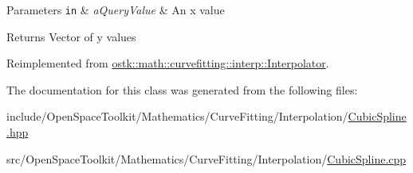 \begin{DoxyParams}[1]{Parameters}
\mbox{\tt in}  & {\em a\+Query\+Value} & An x value \\
\hline
\end{DoxyParams}
\begin{DoxyReturn}{Returns}
Vector of y values 
\end{DoxyReturn}


Reimplemented from \hyperlink{classostk_1_1math_1_1curvefitting_1_1interp_1_1_interpolator_af678ba11fe02754aeaa821bc101fcd87}{ostk\+::math\+::curvefitting\+::interp\+::\+Interpolator}.



The documentation for this class was generated from the following files\+:\begin{DoxyCompactItemize}
\item 
include/\+Open\+Space\+Toolkit/\+Mathematics/\+Curve\+Fitting/\+Interpolation/\hyperlink{_cubic_spline_8hpp}{Cubic\+Spline.\+hpp}\item 
src/\+Open\+Space\+Toolkit/\+Mathematics/\+Curve\+Fitting/\+Interpolation/\hyperlink{_cubic_spline_8cpp}{Cubic\+Spline.\+cpp}\end{DoxyCompactItemize}
